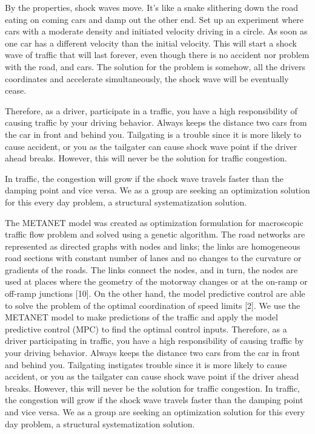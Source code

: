 \documentclass{article}
\begin{document}
 By the properties, shock waves move. It's like a snake slithering down the road eating on coming cars and damp out the other end. Set up an experiment where cars with a moderate density and initiated velocity driving in a circle. As soon as one car has a different velocity than the initial velocity. This will start a shock wave of traffic that will last forever, even though there is no accident nor problem with the road, and cars. The solution for the problem is somehow, all the drivers coordinates and accelerate simultaneously, the shock wave will be eventually cease. 
 
 Therefore, as a driver, participate in a traffic, you have a high responsibility of causing traffic by your driving behavior. Always keeps the distance two cars from the car in front and behind you. Tailgating is a trouble since it is more likely to cause accident, or you as the tailgater can cause shock wave point if the driver ahead breaks. However, this will never be the solution for traffic congestion.
 
In traffic, the congestion will grow if the shock wave
travels faster than the damping point and vice versa. We as a group are seeking an optimization solution for this every day problem, a structural systematization solution. 

The METANET model was created as optimization formulation for macroscopic traffic flow problem and solved
using a genetic algorithm. The road networks are represented as directed graphs with nodes and links; the links are
homogeneous road sections with constant number of lanes and no changes to the curvature or gradients of the roads.
The links connect the nodes, and in turn, the nodes are used at places where the geometry of the motorway changes or
at the on-ramp or off-ramp junctions [10]. On the other hand, the model predictive control are able to solve the problem
of the optimal coordination of speed limits [2]. We use the METANET model to make predictions of the traffic and
apply the model predictive control (MPC) to find the optimal control inputs.
Therefore, as a driver participating in traffic, you have a high responsibility of causing traffic by your driving behavior.
Always keeps the distance two cars from the car in front and behind you. Tailgating instigates trouble since it is more
likely to cause accident, or you as the tailgater can cause shock wave point if the driver ahead breaks. However, this
will never be the solution for traffic congestion. In traffic, the congestion will grow if the shock wave travels faster than
the damping point and vice versa. We as a group are seeking an optimization solution for this every day problem, a
structural systematization solution.
\end{document}
